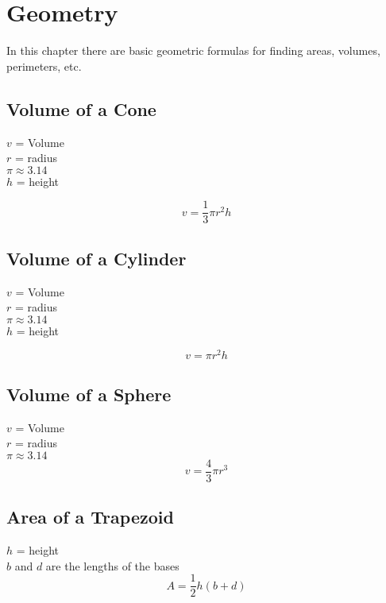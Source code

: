 \chapter{Geometry}

\noindent In this chapter there are basic geometric formulas for finding
areas, volumes, perimeters, etc.

\section{Volume of a Cone}

\noindent $v$ = Volume\\
$r$ = radius\\
$\pi \approx 3.14$\\
$h$ = height

\begin{equation*}
  v = \frac{1}{3} \pi r^2 h
\end{equation*}


\section{Volume of a Cylinder}

\noindent $v$ = Volume\\
$r$ = radius\\
$\pi \approx 3.14$\\
$h$ = height

\begin{equation*}
  v = \pi r^2 h
\end{equation*}


\section{Volume of a Sphere}

\noindent $v$ = Volume\\
$r$ = radius\\
$\pi \approx 3.14$\\

\begin{equation*}
  v = \frac{4}{3} \pi r^3
\end{equation*}


\section{Area of a Trapezoid}

\noindent $h$ = height\\
$b$ and $d$ are the lengths of the bases
\begin{equation*}
  A = \frac{1}{2}h(b+d)
\end{equation*}


